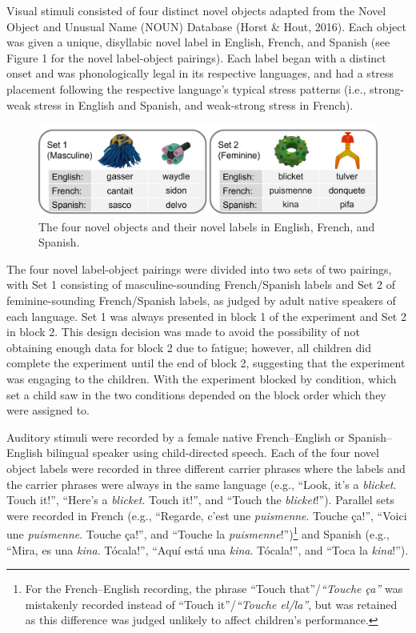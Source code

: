 \documentclass[
  man,floatsintext]{apa7}
\begin{document}
Visual stimuli consisted of four distinct novel objects adapted from the Novel Object and Unusual Name (NOUN) Database (Horst \& Hout, 2016). Each object was given a unique, disyllabic novel label in English, French, and Spanish (see Figure 1 for the novel label-object pairings). Each label began with a distinct onset and was phonologically legal in its respective languages, and had a stress placement following the respective language's typical stress patterns (i.e., strong-weak stress in English and Spanish, and weak-strong stress in French).

\begin{figure}[H]

{\centering \includegraphics[width=0.8\linewidth]{figure/figure1} 

}

\caption{The four novel objects and their novel labels in English, French, and Spanish.}\label{fig:Figure1}
\end{figure}

The four novel label-object pairings were divided into two sets of two pairings, with Set 1 consisting of masculine-sounding French/Spanish labels and Set 2 of feminine-sounding French/Spanish labels, as judged by adult native speakers of each language. Set 1 was always presented in block 1 of the experiment and Set 2 in block 2. This design decision was made to avoid the possibility of not obtaining enough data for block 2 due to fatigue; however, all children did complete the experiment until the end of block 2, suggesting that the experiment was engaging to the children. With the experiment blocked by condition, which set a child saw in the two conditions depended on the block order which they were assigned to.

Auditory stimuli were recorded by a female native French--English or Spanish--English bilingual speaker using child-directed speech. Each of the four novel object labels were recorded in three different carrier phrases where the labels and the carrier phrases were always in the same language (e.g., ``Look, it's a \emph{blicket}. Touch it!'', ``Here's a \emph{blicket}. Touch it!'', and ``Touch the \emph{blicket}!''). Parallel sets were recorded in French (e.g., ``Regarde, c'est une \emph{puismenne}. Touche ça!'', ``Voici une \emph{puismenne}. Touche ça!'', and ``Touche la \emph{puismenne}!'')\footnote{For the French--English recording, the phrase ``Touch that''/\emph{``Touche ça''} was mistakenly recorded instead of ``Touch it''/\emph{``Touche el/la''}, but was retained as this difference was judged unlikely to affect children's performance.} and Spanish (e.g., ``Mira, es una \emph{kina}. Tócala!'', ``Aquí está una \emph{kina}. Tócala!'', and ``Toca la \emph{kina}!'').
\end{document}
